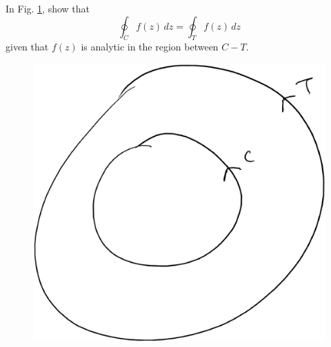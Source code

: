 \documentclass[journal,12pt,twocolumn]{IEEEtran}
\begin{document}
%
\begin{problem}
In Fig. \ref{fig:CT},  show that 
\begin{equation}
\oint_{C}f(z)\,dz = \oint_{T}f(z)\,dz
\end{equation}
given that $f(z)$ is analytic in the region between $C-T$.
\end{problem}
\begin{figure}[!h]
\centering
\includegraphics[width=\columnwidth]{./figs/CT.eps}
\caption{}
\label{fig:CT}
\end{figure}
%
\end{document}
